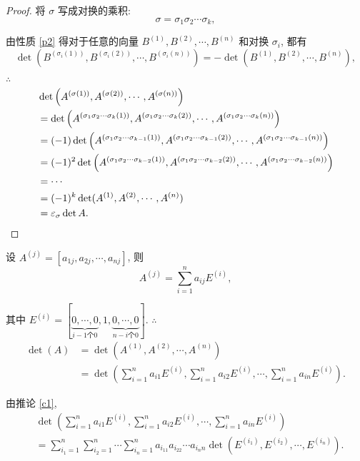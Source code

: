 \documentclass{ctexart}
\begin{document}
\begin{proof}
    将 $\sigma$ 写成对换的乘积:
    \[\sigma=\sigma_1\sigma_2\cdots\sigma_k,\]

    由性质 \ref{p2} 得对于任意的向量 $B^{(1)},B^{(2)},\cdots,B^{(n)}$ 和对换 $\sigma_i$, 都有
    \[\det(B^{(\sigma_i(1))},B^{(\sigma_i(2))},\cdots,B^{(\sigma_i(n))})=-\det(B^{(1)},B^{(2)},\cdots,B^{(n)}),\]

    $\therefore$
    \begin{align*}
        & \det\left(A^{(\sigma(1))},A^{(\sigma(2))},\cdots,A^{(\sigma(n))}\right) \\
        & =\det\left(A^{(\sigma_1\sigma_2\cdots\sigma_k(1))},A^{(\sigma_1\sigma_2\cdots\sigma_k(2))},\cdots,A^{(\sigma_1\sigma_2\cdots\sigma_k(n))}\right) \\
        & =(-1)\det\left(A^{(\sigma_1\sigma_2\cdots\sigma_{k-1}(1))},A^{(\sigma_1\sigma_2\cdots\sigma_{k-1}(2))},\cdots,A^{(\sigma_1\sigma_2\cdots\sigma_{k-1}(n))}\right) \\
        & =(-1)^2\det\left(A^{(\sigma_1\sigma_2\cdots\sigma_{k-2}(1))},A^{(\sigma_1\sigma_2\cdots\sigma_{k-2}(2))},\cdots,A^{(\sigma_1\sigma_2\cdots\sigma_{k-2}(n))}\right) \\
        & =\cdots \\
        & =(-1)^k\det(A^{(1)},A^{(2)},\cdots,A^{(n)}) \\
        & =\varepsilon_\sigma\det A.\qedhere
    \end{align*}
\end{proof}

设 $A^{(j)}=[a_{1j},a_{2j},\cdots,a_{nj}]$, 则
\[A^{(j)}=\sum\limits_{i=1}^na_{ij}E^{(i)},\]

其中 $E^{(i)}=[\underbrace{0,\cdots,0}_{i-1\text{个}0},1,\underbrace{0,\cdots,0}_{n-i\text{个}0}]$. $\therefore$
\begin{align*}
    \det(A) & =\det(A^{(1)},A^{(2)},\cdots,A^{(n)}) \\
    & =\det\left(\sum\limits_{i=1}^na_{i1}E^{(i)},\sum\limits_{i=1}^na_{i2}E^{(i)},\cdots,\sum\limits_{i=1}^na_{in}E^{(i)}\right).
\end{align*}

由推论 \ref{c1},
\begin{align*}
    & \det\left(\sum\limits_{i=1}^na_{i1}E^{(i)},\sum\limits_{i=1}^na_{i2}E^{(i)},\cdots,\sum\limits_{i=1}^na_{in}E^{(i)}\right) \\
    & =\sum\limits_{i_1=1}^n\sum\limits_{i_2=1}^n\cdots\sum\limits_{i_n=1}^na_{i_11}a_{i_22}\cdots a_{i_nn}\det\left(E^{(i_1)},E^{(i_2)},\cdots,E^{(i_n)}\right). \\
\end{align*}
\end{document}
